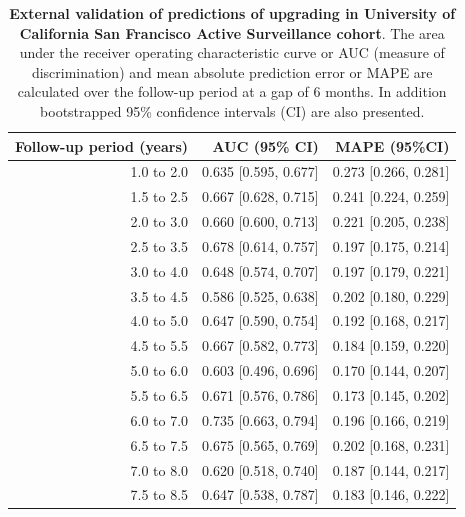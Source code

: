 \begin{subappendices}
\begin{table}
\small
\centering
\caption{\textbf{External validation of predictions of upgrading in University of California San Francisco Active Surveillance cohort}. The area under the receiver operating characteristic curve or AUC (measure of discrimination) and mean absolute prediction error or MAPE are calculated over the follow-up period at a gap of 6 months. In addition bootstrapped 95\% confidence intervals (CI) are also presented.}
\label{c5:tab:AUC_PE_UCSF}
\begin{tabular}{r|r|r}
\hline
\hline
Follow-up period (years) & AUC (95\% CI) & MAPE (95\%CI)\\ 
\hline
1.0 to 2.0 & 0.635 [0.595, 0.677] & 0.273 [0.266, 0.281]\\
1.5 to 2.5 & 0.667 [0.628, 0.715] & 0.241 [0.224, 0.259]\\
2.0 to 3.0 & 0.660 [0.600, 0.713] & 0.221 [0.205, 0.238]\\
2.5 to 3.5 & 0.678 [0.614, 0.757] & 0.197 [0.175, 0.214]\\
3.0 to 4.0 & 0.648 [0.574, 0.707] & 0.197 [0.179, 0.221]\\
3.5 to 4.5 & 0.586 [0.525, 0.638] & 0.202 [0.180, 0.229]\\
4.0 to 5.0 & 0.647 [0.590, 0.754] & 0.192 [0.168, 0.217]\\
4.5 to 5.5 & 0.667 [0.582, 0.773] & 0.184 [0.159, 0.220]\\
5.0 to 6.0 & 0.603 [0.496, 0.696] & 0.170 [0.144, 0.207]\\
5.5 to 6.5 & 0.671 [0.576, 0.786] & 0.173 [0.145, 0.202]\\
6.0 to 7.0 & 0.735 [0.663, 0.794] & 0.196 [0.166, 0.219]\\
6.5 to 7.5 & 0.675 [0.565, 0.769] & 0.202 [0.168, 0.231]\\
7.0 to 8.0 & 0.620 [0.518, 0.740] & 0.187 [0.144, 0.217]\\
7.5 to 8.5 & 0.647 [0.538, 0.787] & 0.183 [0.146, 0.222]\\
\hline
\end{tabular}    
\end{table}


\end{subappendices}
